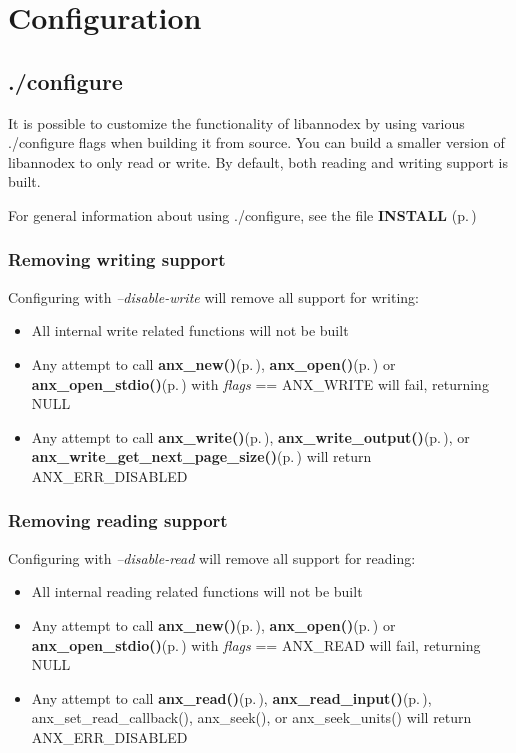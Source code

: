 \section{Configuration}
\label{group__configuration}
\subsection{./configure}\label{configure}
It is possible to customize the functionality of libannodex by using various ./configure flags when building it from source. You can build a smaller version of libannodex to only read or write. By default, both reading and writing support is built.

For general information about using ./configure, see the file {\bf INSTALL }{\rm (p.\,\pageref{group__install})}\subsubsection{Removing writing support}\label{no_encode}
Configuring with {\em --disable-write\/} will remove all support for writing:\begin{itemize}
\item All internal write related functions will not be built\item Any attempt to call {\bf anx\_\-new()}{\rm (p.\,\pageref{anx__general_8h_a5})}, {\bf anx\_\-open()}{\rm (p.\,\pageref{anx__general_8h_a3})} or {\bf anx\_\-open\_\-stdio()}{\rm (p.\,\pageref{anx__general_8h_a4})} with {\em flags\/} == ANX\_\-WRITE will fail, returning NULL\item Any attempt to call {\bf anx\_\-write()}{\rm (p.\,\pageref{anx__write_8h_a10})}, {\bf anx\_\-write\_\-output()}{\rm (p.\,\pageref{anx__write_8h_a11})}, or {\bf anx\_\-write\_\-get\_\-next\_\-page\_\-size()}{\rm (p.\,\pageref{anx__write_8h_a1})} will return ANX\_\-ERR\_\-DISABLED\end{itemize}
\subsubsection{Removing reading support}\label{no_decode}
Configuring with {\em --disable-read\/} will remove all support for reading:\begin{itemize}
\item All internal reading related functions will not be built\item Any attempt to call {\bf anx\_\-new()}{\rm (p.\,\pageref{anx__general_8h_a5})}, {\bf anx\_\-open()}{\rm (p.\,\pageref{anx__general_8h_a3})} or {\bf anx\_\-open\_\-stdio()}{\rm (p.\,\pageref{anx__general_8h_a4})} with {\em flags\/} == ANX\_\-READ will fail, returning NULL\item Any attempt to call {\bf anx\_\-read()}{\rm (p.\,\pageref{anx__read_8h_a16})}, {\bf anx\_\-read\_\-input()}{\rm (p.\,\pageref{anx__read_8h_a17})}, anx\_\-set\_\-read\_\-callback(), anx\_\-seek(), or anx\_\-seek\_\-units() will return ANX\_\-ERR\_\-DISABLED \end{itemize}


